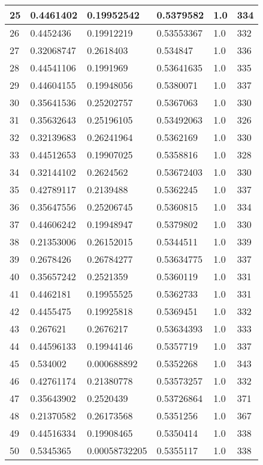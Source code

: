 \begin{longtable}{|l|l|l|l|l|l|}
25 & 0.4461402 & 0.19952542 & 0.5379582 & 1.0 & 334 \\ \hline 
26 & 0.4452436 & 0.19912219 & 0.53553367 & 1.0 & 332 \\ \hline 
27 & 0.32068747 & 0.2618403 & 0.534847 & 1.0 & 336 \\ \hline 
28 & 0.44541106 & 0.1991969 & 0.53641635 & 1.0 & 335 \\ \hline 
29 & 0.44604155 & 0.19948056 & 0.5380071 & 1.0 & 337 \\ \hline 
30 & 0.35641536 & 0.25202757 & 0.5367063 & 1.0 & 330 \\ \hline 
31 & 0.35632643 & 0.25196105 & 0.53492063 & 1.0 & 326 \\ \hline 
32 & 0.32139683 & 0.26241964 & 0.5362169 & 1.0 & 330 \\ \hline 
33 & 0.44512653 & 0.19907025 & 0.5358816 & 1.0 & 328 \\ \hline 
34 & 0.32144102 & 0.2624562 & 0.53672403 & 1.0 & 330 \\ \hline 
35 & 0.42789117 & 0.2139488 & 0.5362245 & 1.0 & 337 \\ \hline 
36 & 0.35647556 & 0.25206745 & 0.5360815 & 1.0 & 334 \\ \hline 
37 & 0.44606242 & 0.19948947 & 0.5379802 & 1.0 & 330 \\ \hline 
38 & 0.21353006 & 0.26152015 & 0.5344511 & 1.0 & 339 \\ \hline 
39 & 0.2678426 & 0.26784277 & 0.53634775 & 1.0 & 337 \\ \hline 
40 & 0.35657242 & 0.2521359 & 0.5360119 & 1.0 & 331 \\ \hline 
41 & 0.4462181 & 0.19955525 & 0.5362733 & 1.0 & 331 \\ \hline 
42 & 0.4455475 & 0.19925818 & 0.5369451 & 1.0 & 332 \\ \hline 
43 & 0.267621 & 0.2676217 & 0.53634393 & 1.0 & 333 \\ \hline 
44 & 0.44596133 & 0.19944146 & 0.5357719 & 1.0 & 337 \\ \hline 
45 & 0.534002 & 0.000688892 & 0.5352268 & 1.0 & 343 \\ \hline 
46 & 0.42761174 & 0.21380778 & 0.53573257 & 1.0 & 332 \\ \hline 
47 & 0.35643902 & 0.2520439 & 0.53726864 & 1.0 & 371 \\ \hline 
48 & 0.21370582 & 0.26173568 & 0.5351256 & 1.0 & 367 \\ \hline 
49 & 0.44516334 & 0.19908465 & 0.5350414 & 1.0 & 338 \\ \hline 
50 & 0.5345365 & 0.00058732205 & 0.5355117 & 1.0 & 338 \\ \hline 
\end{longtable}